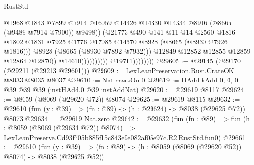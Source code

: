 \begin{lexlean}{RustStd}
\begin{coremodule}
                                                  @1968
                                                  @1843
                                                  @7899
                                                  @7914
                                                  @16059
                                                  @14326
                                                  @14330
                                                  @14334
                                                  @8916
                                                  (@8665 (@9489 @7914 @7900))
                                                  @9498))
                                              (@21773
                                                @490
                                                @141
                                                @11
                                                @14
                                                @2560
                                                @1816
                                                @1802
                                                @1831
                                                @7925
                                                @1776
                                                @17085
                                                @14670
                                                @8928
                                                (@8665 (@8930 @7926 @1816)))
                                              @8928
                                              (@8665 (@8930 @7892 @7932)))
                                            @12849
                                            @12852
                                            @12855
                                            @12859
                                            @12864
                                            @12870))
                                        @14610))))))))))
                    @19711))))))))
@29605 := @29145 (@29170 (@29211 (@29213 @29601)))
@29609 := LexLeanPreservation.Rust.CrateOK @8033 @8035 @8037
@29610 := Nat.casesOn.{0}
@29619 := HAdd.hAdd.{0, 0, 0} @39 @39 @39 (instHAdd.{0} @39 instAddNat)
@29620 := @29619 @8117
@29624 := @8059 (@8069 (@29620 @72)) @8074
@29625 := @29619 @8115
@29632 := @29610 (fun (y : @39) => (fn : @89) -> (h : @29624) -> @8038 (@29625 @72)) @8073
@29634 := @29619 Nat.zero
@29642 := @29632
    (fun (fn : @89) =>
    fun (h : @8059 (@8069 (@29634 @72)) @8074) =>
    LexLeanPreserve.Cd93f705b885f15c843e9e082af05e97c.R2.RustStd.fun0)
@29661 := @29610
    (fun (y : @39) => (fn : @89) -> (h : @8059 (@8069 (@29620 @52)) @8074) -> @8038 (@29625 @52))

\end{coremodule}
\end{lexlean}
